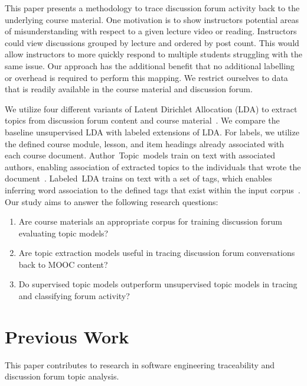 \documentclass[sigconf, anonymous]{acmart}
\begin{document}
This paper presents a methodology to trace discussion forum activity back to the underlying course material.
One motivation is to show instructors potential areas of misunderstanding with respect to a given lecture video or reading.
Instructors could view discussions grouped by lecture and ordered by post count.
This would allow instructors to more quickly respond to multiple students struggling with the same issue.
Our approach has the additional benefit that no additional labelling or overhead is required to perform this mapping.
We restrict ourselves to data that is readily available in the course material and discussion forum.

We utilize four different variants of Latent Dirichlet Allocation (LDA) to extract topics from discussion forum content and course material~\cite{blei2003latent}.
We compare the baseline unsupervised LDA with labeled extensions of LDA.
For labels, we utilize the defined course module, lesson, and item headings already associated with each course document.
Author~Topic~models train on text with associated authors, enabling association of extracted topics to the individuals that wrote the document~\cite{rosen2004author}.
Labeled~LDA trains on text with a set of tags, which enables inferring word association to the defined tags that exist within the input corpus~\cite{ramage2009labeled}.
Our study aims to answer the following research questions:

\begin{enumerate}[label=\textbf{RQ\arabic*:}]
    \item Are course materials an appropriate corpus for training discussion forum evaluating topic models? %
    \item Are topic extraction models useful in tracing discussion forum conversations back to MOOC content? %
    \item Do supervised topic models outperform unsupervised topic models in tracing and classifying forum activity? %
\end{enumerate}

\section{Previous Work}
This paper contributes to research in software engineering traceability and discussion forum topic analysis.
\end{document}
